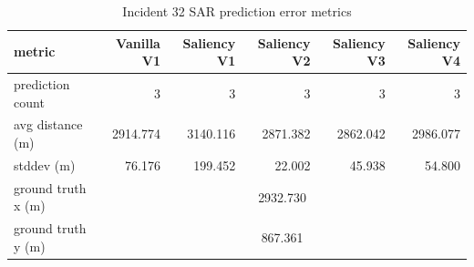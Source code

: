 \begin{table}[ht]
\centering
\caption{Incident 32 SAR prediction error metrics}
\label{tab:sar-incident-32}
\begin{tabular}{lrrrrr}
\hline
metric & Vanilla V1 & Saliency V1 & Saliency V2 & Saliency V3 & Saliency V4 \\
\hline
prediction count & 3 & 3 & 3 & 3 & 3 \\
avg distance (m) & 2914.774 & 3140.116 & 2871.382 & 2862.042 & 2986.077 \\
stddev (m) & 76.176 & 199.452 & 22.002 & 45.938 & 54.800 \\
ground truth x (m) & \multicolumn{5}{c}{2932.730} \\
ground truth y (m) & \multicolumn{5}{c}{867.361} \\
\hline
\end{tabular}
\end{table}

